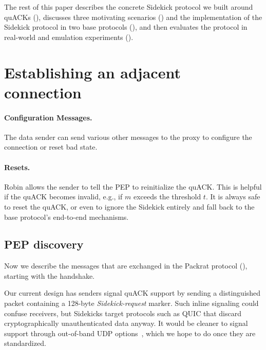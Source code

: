 \smallskip

The rest of this paper describes the concrete Sidekick protocol we
built around quACKs (),
discusses three motivating scenarios () and
the implementation of the Sidekick protocol in two
base protocols (), and then evaluates the
protocol in real-world and emulation experiments
().

\section{Establishing an adjacent connection}
\label{sec:sidekick:init}

\paragraph{Configuration Messages.}

The data sender can send various other messages to the proxy
to configure the connection or reset bad state.

\paragraph{Resets.}
Robin allows the sender to tell the PEP to reinitialize the quACK.
This is helpful if the quACK becomes
invalid, e.g., if $m$ exceeds the threshold $t$. It is
always safe to reset the quACK, or even to ignore the Sidekick entirely and
fall back to the base protocol's end-to-end mechanisms.

\subsection{PEP discovery}
\label{sec:sidekick:init:discovery}



Now we describe the messages that are exchanged in the
Packrat protocol (), starting with the handshake.

Our current design has senders signal quACK support by sending a
distinguished packet containing a 128-byte \emph{Sidekick-request} marker.  Such
inline signaling could confuse receivers, but Sidekicks target
protocols such as QUIC that discard cryptographically unauthenticated
data anyway.  It would be cleaner to signal support through
out-of-band UDP options~\cite{ietf-tsvwg-udp-options-28}, which we hope to do
once they are standardized.

